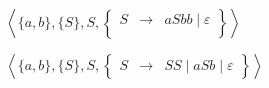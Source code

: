 \begin{corrections}
\begin{questions}
  \item $\left\langle \{a, b\}, \{S\}, S,
    \left\{\begin{array}{lll}
    S   &\rightarrow& a S b b \mid \varepsilon \\
    \end{array}\right\}\right\rangle$

  \item $\left\langle \{a, b\}, \{S\}, S,
    \left\{\begin{array}{lll}
    S   &\rightarrow& S S \mid a S b \mid \varepsilon
    \end{array}\right\}\right\rangle$

  \end{questions}

\end{corrections}

\endgroup
\endinput
